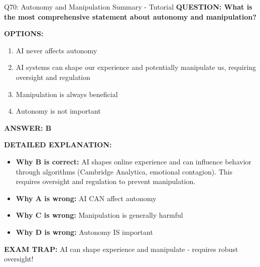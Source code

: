 \documentclass[8pt]{beamer}
\begin{document}
	\begin{frame}{Q70: Autonomy and Manipulation Summary - Tutorial}
		\fontsize{6.5}{7.5}\selectfont
		\textbf{QUESTION: What is the most comprehensive statement about autonomy and manipulation?}
		
		\vspace{0.1cm}
		\textbf{OPTIONS:}
		\begin{enumerate}
			\item AI never affects autonomy
			\item AI systems can shape our experience and potentially manipulate us, requiring oversight and regulation
			\item Manipulation is always beneficial
			\item Autonomy is not important
		\end{enumerate}
		
		\vspace{0.1cm}
		\textcolor{myblue}{\textbf{ANSWER: B}}
		
		\vspace{0.1cm}
		\textbf{DETAILED EXPLANATION:}
		\begin{itemize}
			\item \textbf{Why B is correct:} AI shapes online experience and can influence behavior through algorithms (Cambridge Analytica, emotional contagion). This requires oversight and regulation to prevent manipulation.
			\item \textbf{Why A is wrong:} AI CAN affect autonomy
			\item \textbf{Why C is wrong:} Manipulation is generally harmful
			\item \textbf{Why D is wrong:} Autonomy IS important
		\end{itemize}
		
		\textcolor{myred}{\textbf{EXAM TRAP:}} AI can \textcolor{myblue}{shape experience and manipulate} - requires robust oversight!
	\end{frame}
	
	
\end{document}
